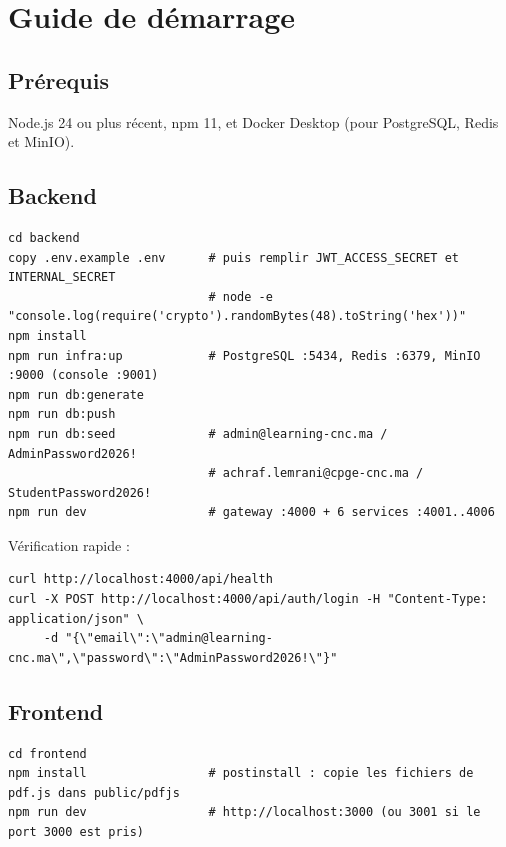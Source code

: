 \section{Guide de démarrage}

\subsection{Prérequis}
Node.js 24 ou plus récent, npm 11, et Docker Desktop (pour PostgreSQL, Redis et MinIO).

\subsection{Backend}
\begin{lstlisting}[numbers=none,language={}]
cd backend
copy .env.example .env      # puis remplir JWT_ACCESS_SECRET et INTERNAL_SECRET
                            # node -e "console.log(require('crypto').randomBytes(48).toString('hex'))"
npm install
npm run infra:up            # PostgreSQL :5434, Redis :6379, MinIO :9000 (console :9001)
npm run db:generate
npm run db:push
npm run db:seed             # admin@learning-cnc.ma / AdminPassword2026!
                            # achraf.lemrani@cpge-cnc.ma / StudentPassword2026!
npm run dev                 # gateway :4000 + 6 services :4001..4006
\end{lstlisting}

Vérification rapide :
\begin{lstlisting}[numbers=none,language={}]
curl http://localhost:4000/api/health
curl -X POST http://localhost:4000/api/auth/login -H "Content-Type: application/json" \
     -d "{\"email\":\"admin@learning-cnc.ma\",\"password\":\"AdminPassword2026!\"}"
\end{lstlisting}

\subsection{Frontend}
\begin{lstlisting}[numbers=none,language={}]
cd frontend
npm install                 # postinstall : copie les fichiers de pdf.js dans public/pdfjs
npm run dev                 # http://localhost:3000 (ou 3001 si le port 3000 est pris)
\end{lstlisting}

